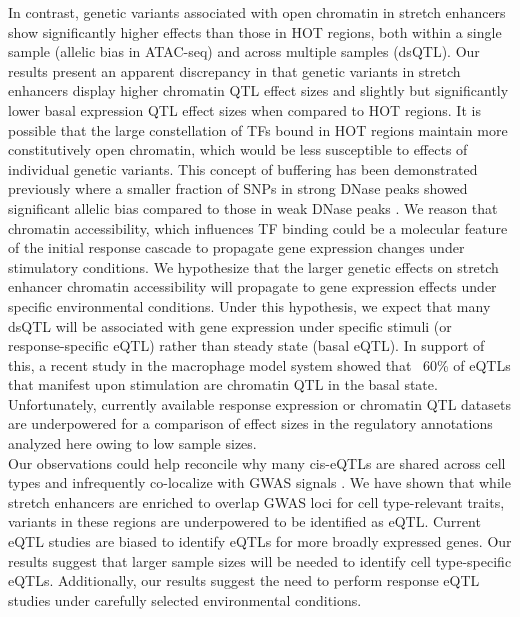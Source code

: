 In contrast, genetic variants associated with open chromatin in stretch enhancers show significantly higher effects than those in HOT regions, both within a single sample (allelic bias in ATAC-seq) and across multiple samples (dsQTL). Our results present an apparent discrepancy in that genetic variants in stretch enhancers display higher chromatin QTL effect sizes and slightly but significantly lower basal expression QTL effect sizes when compared to HOT regions. It is possible that the large constellation of TFs bound in HOT regions \cite{theencodeprojectconsortiumIntegratedEncyclopediaDNA2012, kudronModERNResourceGenomeWide2017} maintain more constitutively open chromatin, which would be less susceptible to effects of individual genetic variants. This concept of buffering has been demonstrated previously where a smaller fraction of SNPs in strong DNase peaks showed significant allelic bias compared to those in weak DNase peaks \cite{mauranoLargescaleIdentificationSequence2015}. We reason that chromatin accessibility, which influences TF binding could be a molecular feature of the initial response cascade to propagate gene expression changes under stimulatory conditions. We hypothesize that the larger genetic effects on stretch enhancer chromatin accessibility will propagate to gene expression effects under specific environmental conditions. Under this hypothesis, we expect that many dsQTL will be associated with gene expression under specific stimuli (or response-specific eQTL) rather than steady state (basal eQTL). In support of this, a recent study in the macrophage model system \cite{alasooSharedGeneticEffects2018} showed that ~60\% of eQTLs that manifest upon stimulation are chromatin QTL in the basal state. Unfortunately, currently available response expression or chromatin QTL datasets are underpowered for a comparison of effect sizes in the regulatory annotations analyzed here owing to low sample sizes. \\

Our observations could help reconcile why many cis-eQTLs are shared across cell types and infrequently co-localize with GWAS signals \cite{liuFunctionalArchitecturesLocal2017, huangFinemappingInflammatoryBowel2017, gtexconsortiumGeneticEffectsGene2017}. We have shown that while stretch enhancers are enriched to overlap GWAS loci for cell type-relevant traits, variants in these regions are underpowered to be identified as eQTL. Current eQTL studies are biased to identify eQTLs for more broadly expressed genes. Our results suggest that larger sample sizes will be needed to identify cell type-specific eQTLs. Additionally, our results suggest the need to perform response eQTL studies under carefully selected environmental conditions.

